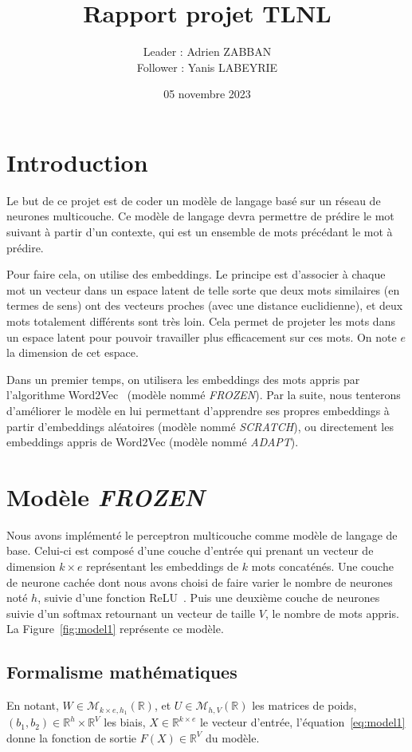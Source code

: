 \documentclass[a4paper]{article}
\title{Rapport projet TLNL}
\author{Leader : Adrien ZABBAN \\ Follower : Yanis LABEYRIE}
\date{05 novembre 2023}
\begin{document}
\maketitle


\section{Introduction}

Le but de ce projet est de coder un modèle de langage basé sur un réseau de neurones multicouche. Ce modèle de langage devra permettre 
de prédire le mot suivant à partir d'un contexte, qui est un ensemble de mots précédant le mot à prédire. 

Pour faire cela, on utilise des embeddings. Le principe est d'associer à chaque mot un vecteur dans un espace latent de telle sorte que 
deux mots similaires (en termes de sens) ont des vecteurs proches (avec une distance euclidienne), et deux mots totalement différents 
sont très loin. Cela permet de projeter les mots dans un espace latent pour pouvoir travailler plus efficacement sur ces mots. 
On note $e$ la dimension de cet espace.

Dans un premier temps, on utilisera les embeddings des mots appris par l'algorithme Word2Vec~\cite{mikolov2013efficient} 
(modèle nommé \textit{FROZEN}). Par la suite, nous tenterons d'améliorer le modèle en lui permettant d'apprendre ses propres 
embeddings à partir d'embeddings aléatoires (modèle nommé \textit{SCRATCH}), ou directement les embeddings appris de Word2Vec 
(modèle nommé \textit{ADAPT}).


\section{Modèle \textit{FROZEN}}

Nous avons implémenté le perceptron multicouche comme modèle de langage de base. Celui-ci est composé d'une couche d'entrée qui 
prenant un vecteur de dimension $k \times e$ représentant les embeddings de $k$ mots concaténés. Une couche de neurone cachée dont 
nous avons choisi de faire varier le nombre de neurones noté $h$, suivie d'une fonction ReLU~\cite{DBLP:journals/corr/abs-1803-08375}. 
Puis une deuxième couche de neurones suivie d'un softmax retournant un vecteur de taille $V$, le nombre de mots appris. 
La Figure~\ref{fig:model1} représente ce modèle.

\subsection{Formalisme mathématiques}
En notant, $W \in \mathcal{M}_{k \times e, h_1}(\mathbb{R})$, et $U \in \mathcal{M}_{h, V}(\mathbb{R})$ les matrices de poids, 
$(b_1,b_2) \in \mathbb{R}^{h} \times \mathbb{R}^{V}$ les biais, $X \in \mathbb{R}^{k \times e}$ le vecteur d'entrée, 
l'équation~\eqref{eq:model1} donne la fonction de sortie $F(X) \in \mathbb{R}^{V}$ du modèle. 
\end{document}
